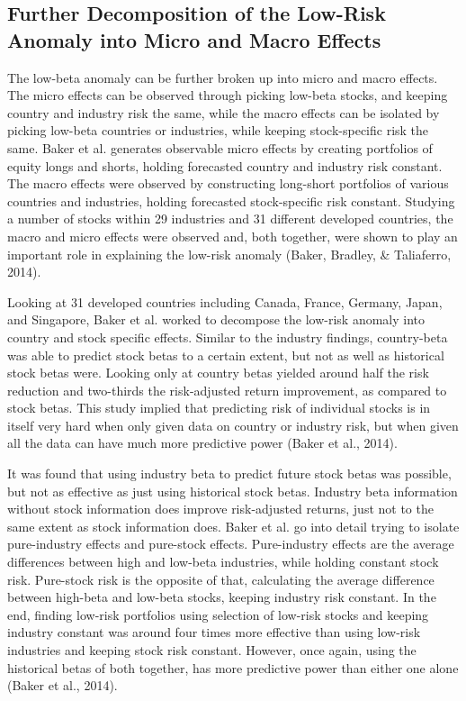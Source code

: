 \documentclass[12pt,twoside]{reedthesis}
\theoremstyle{definition}
\theoremstyle{definition}
\theoremstyle{definition}
\theoremstyle{remark}
\begin{document}
\subsection{Further Decomposition of the Low-Risk Anomaly into Micro and
Macro
Effects}\label{further-decomposition-of-the-low-risk-anomaly-into-micro-and-macro-effects}

The low-beta anomaly can be further broken up into micro and macro
effects. The micro effects can be observed through picking low-beta
stocks, and keeping country and industry risk the same, while the macro
effects can be isolated by picking low-beta countries or industries,
while keeping stock-specific risk the same. Baker et al. generates
observable micro effects by creating portfolios of equity longs and
shorts, holding forecasted country and industry risk constant. The macro
effects were observed by constructing long-short portfolios of various
countries and industries, holding forecasted stock-specific risk
constant. Studying a number of stocks within 29 industries and 31
different developed countries, the macro and micro effects were observed
and, both together, were shown to play an important role in explaining
the low-risk anomaly (Baker, Bradley, \& Taliaferro, 2014).

Looking at 31 developed countries including Canada, France, Germany,
Japan, and Singapore, Baker et al. worked to decompose the low-risk
anomaly into country and stock specific effects. Similar to the industry
findings, country-beta was able to predict stock betas to a certain
extent, but not as well as historical stock betas were. Looking only at
country betas yielded around half the risk reduction and two-thirds the
risk-adjusted return improvement, as compared to stock betas. This study
implied that predicting risk of individual stocks is in itself very hard
when only given data on country or industry risk, but when given all the
data can have much more predictive power (Baker et al., 2014).

It was found that using industry beta to predict future stock betas was
possible, but not as effective as just using historical stock betas.
Industry beta information without stock information does improve
risk-adjusted returns, just not to the same extent as stock information
does. Baker et al. go into detail trying to isolate pure-industry
effects and pure-stock effects. Pure-industry effects are the average
differences between high and low-beta industries, while holding constant
stock risk. Pure-stock risk is the opposite of that, calculating the
average difference between high-beta and low-beta stocks, keeping
industry risk constant. In the end, finding low-risk portfolios using
selection of low-risk stocks and keeping industry constant was around
four times more effective than using low-risk industries and keeping
stock risk constant. However, once again, using the historical betas of
both together, has more predictive power than either one alone (Baker et
al., 2014).
\end{document}
